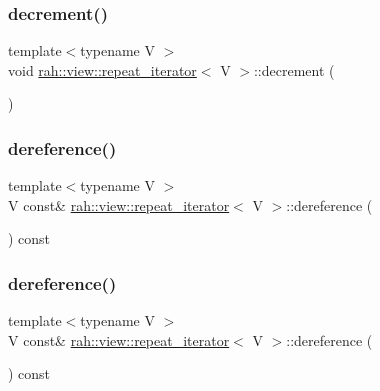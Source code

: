 \subsubsection{\texorpdfstring{decrement()}{decrement()}\hspace{0.1cm}{\footnotesize\ttfamily [2/2]}}
{\footnotesize\ttfamily template$<$typename V $>$ \\
void \mbox{\hyperlink{structrah_1_1view_1_1repeat__iterator}{rah\+::view\+::repeat\+\_\+iterator}}$<$ V $>$\+::decrement (\begin{DoxyParamCaption}{ }\end{DoxyParamCaption})\hspace{0.3cm}{\ttfamily [inline]}}

\mbox{\label{structrah_1_1view_1_1repeat__iterator_a0b1fbfa1670a227d4d129dcdb9a549e8}} 
\subsubsection{\texorpdfstring{dereference()}{dereference()}\hspace{0.1cm}{\footnotesize\ttfamily [1/2]}}
{\footnotesize\ttfamily template$<$typename V $>$ \\
V const\& \mbox{\hyperlink{structrah_1_1view_1_1repeat__iterator}{rah\+::view\+::repeat\+\_\+iterator}}$<$ V $>$\+::dereference (\begin{DoxyParamCaption}{ }\end{DoxyParamCaption}) const\hspace{0.3cm}{\ttfamily [inline]}}

\mbox{\label{structrah_1_1view_1_1repeat__iterator_a0b1fbfa1670a227d4d129dcdb9a549e8}} 
\subsubsection{\texorpdfstring{dereference()}{dereference()}\hspace{0.1cm}{\footnotesize\ttfamily [2/2]}}
{\footnotesize\ttfamily template$<$typename V $>$ \\
V const\& \mbox{\hyperlink{structrah_1_1view_1_1repeat__iterator}{rah\+::view\+::repeat\+\_\+iterator}}$<$ V $>$\+::dereference (\begin{DoxyParamCaption}{ }\end{DoxyParamCaption}) const\hspace{0.3cm}{\ttfamily [inline]}}

